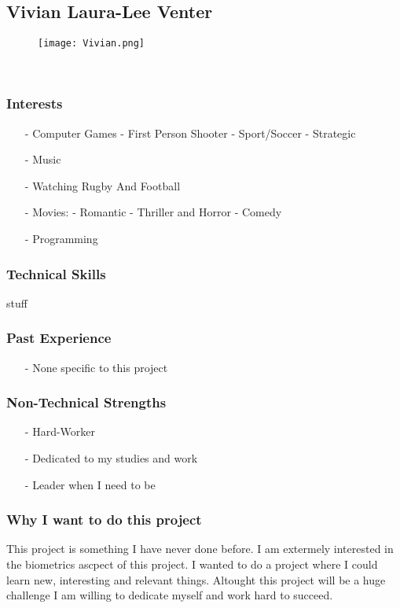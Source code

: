 \subsection{Vivian Laura-Lee Venter}
\begin{wrapfigure}[7]{l}{0.25\textwidth}
\vspace{10pt}
\texttt{[image: Vivian.png]}
\end{wrapfigure}

\textcolor{white}{.}
\subsubsection{Interests}
\begin{itemize}
	\item[-]{Computer Games}
		\subitem- First Person Shooter
		\subitem- Sport/Soccer
		\subitem- Strategic
	\item[-]{Music}
	\item[-]{Watching Rugby And Football}
	\item[-]{Movies:}
		\subitem- Romantic
		\subitem- Thriller and Horror
		\subitem- Comedy
	\item[-]{Programming}
\end{itemize}
\subsubsection{Technical Skills} stuff
\subsubsection{Past Experience} 
\begin{itemize}
	\item[-]{None specific to this project}
\end{itemize}
\subsubsection{Non-Technical Strengths}
\begin{itemize}
	\item[-]{Hard-Worker}
	\item[-]{Dedicated to my studies and work}
	\item[-]{Leader when I need to be}
\end{itemize}
\subsubsection{Why I want to do this project}
This project is something I have never done before. I am extermely interested in the biometrics ascpect of this project. I wanted to do a project where I could learn new, interesting and relevant things. Altought this project will be a huge challenge I am willing to dedicate myself and work hard to succeed. 
